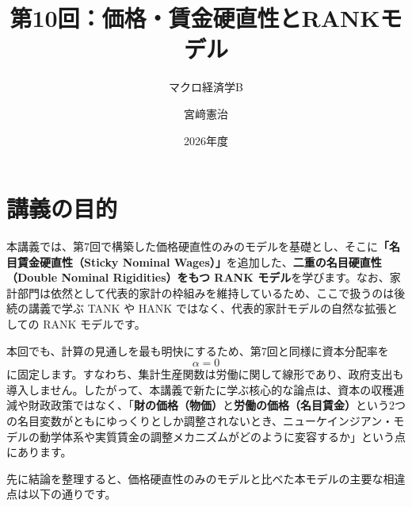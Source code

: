 \documentclass[
  japanese,
  lualatex,
  ja=standard,
  12pt,
  a4paper]{ltjsarticle}
\title{第10回：価格・賃金硬直性とRANKモデル}
\subtitle{マクロ経済学B}
\author{宮﨑憲治}
\date{2026年度}
\renewcommand*\contentsname{目次}
\newcommand\contentsname{目次}
\begin{document}
\maketitle

\renewcommand*\contentsname{目次}
{
\setcounter{tocdepth}{3}
\tableofcontents
}

\section{講義の目的}\label{ux8b1bux7fa9ux306eux76eeux7684}

本講義では、第7回で構築した価格硬直性のみのモデルを基礎とし、そこに\textbf{「名目賃金硬直性（Sticky
Nominal Wages）」}を追加した、\textbf{二重の名目硬直性（Double Nominal
Rigidities）をもつ RANK
モデル}を学びます。なお、家計部門は依然として代表的家計の枠組みを維持しているため、ここで扱うのは後続の講義で学ぶ
TANK や HANK ではなく、代表的家計モデルの自然な拡張としての RANK
モデルです。

本回でも、計算の見通しを最も明快にするため、第7回と同様に資本分配率を \[
\alpha=0
\]
に固定します。すなわち、集計生産関数は労働に関して線形であり、政府支出も導入しません。したがって、本講義で新たに学ぶ核心的な論点は、資本の収穫逓減や財政政策ではなく、「\textbf{財の価格（物価）}と\textbf{労働の価格（名目賃金）}という2つの名目変数がともにゆっくりとしか調整されないとき、ニューケインジアン・モデルの動学体系や実質賃金の調整メカニズムがどのように変容するか」という点にあります。

先に結論を整理すると、価格硬直性のみのモデルと比べた本モデルの主要な相違点は以下の通りです。
\end{document}
